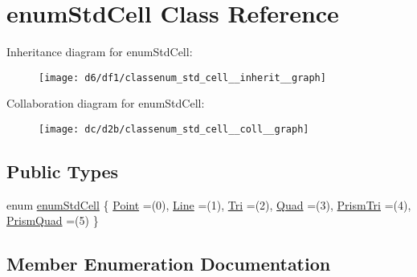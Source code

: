 \hypertarget{classenum_std_cell}{}\section{enum\+Std\+Cell Class Reference}
\label{classenum_std_cell}


Inheritance diagram for enum\+Std\+Cell\+:
\nopagebreak
\begin{figure}[H]
\begin{center}
\leavevmode
\texttt{[image: d6/df1/classenum\_std\_cell\_\_inherit\_\_graph]}
\end{center}
\end{figure}


Collaboration diagram for enum\+Std\+Cell\+:
\nopagebreak
\begin{figure}[H]
\begin{center}
\leavevmode
\texttt{[image: dc/d2b/classenum\_std\_cell\_\_coll\_\_graph]}
\end{center}
\end{figure}
\subsection*{Public Types}
\begin{DoxyCompactItemize}
\item 
enum \hyperlink{classenum_std_cell_ac4c2fa4e189e76e103f3ff9b1d19b9e7}{enum\+Std\+Cell} \{ \newline
\hyperlink{classenum_std_cell_ac4c2fa4e189e76e103f3ff9b1d19b9e7a055fa6159d5be915a3c9df01d16d5bb7}{Point} =(0), 
\hyperlink{classenum_std_cell_ac4c2fa4e189e76e103f3ff9b1d19b9e7afd257c7a2b7d6efb3bd9f67c8a36d3cd}{Line} =(1), 
\hyperlink{classenum_std_cell_ac4c2fa4e189e76e103f3ff9b1d19b9e7aab74b152bf112943fbdb2b523d4e64fc}{Tri} =(2), 
\hyperlink{classenum_std_cell_ac4c2fa4e189e76e103f3ff9b1d19b9e7a79d1c44e78bdfebfd755a724f5e04029}{Quad} =(3), 
\newline
\hyperlink{classenum_std_cell_ac4c2fa4e189e76e103f3ff9b1d19b9e7a50e59d01719761402ae7fe95c54b1360}{Prism\+Tri} =(4), 
\hyperlink{classenum_std_cell_ac4c2fa4e189e76e103f3ff9b1d19b9e7aeed411017d3367dd2c36b851be8666ea}{Prism\+Quad} =(5)
 \}
\end{DoxyCompactItemize}


\subsection{Member Enumeration Documentation}
\mbox{\label{classenum_std_cell_ac4c2fa4e189e76e103f3ff9b1d19b9e7}} 
